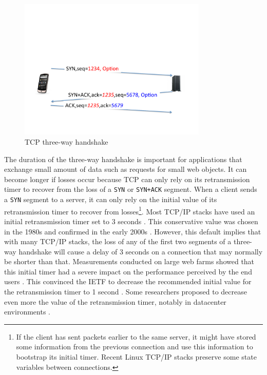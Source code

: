 \begin{figure}
\begin{center}
\includegraphics[width=0.8\textwidth]{figures/mptcp-ebook/Diapositive05.pdf}
\end{center}
\caption{TCP three-way handshake}\label{fig:tcp-establish}
\end{figure}


The duration of the three-way handshake is important for applications that exchange small amount of data such as requests for small web objects. It can become longer if losses occur because TCP can only rely on its retransmission timer to recover from the loss of a \texttt{SYN} or \texttt{SYN+ACK} segment. When a client sends a \texttt{SYN} segment to a server, it can only rely on the initial value of its retransmission timer to recover from losses\footnote{If the client has sent packets earlier to the same server, it might have stored some information from the previous connection \cite{rfc2140,Balakrishnan:1999:ICM:316188.316220} and use this information to bootstrap its initial timer. Recent Linux TCP/IP stacks preserve some state variables between connections.}. Most TCP/IP stacks have used an initial retransmission timer set to 3 seconds \cite{rfc1122}. This conservative value was chosen in the 1980s and confirmed in the early 2000s \cite{rfc2988}. However, this default implies that with many TCP/IP stacks, the loss of any of the first two segments of a three-way handshake will cause a delay of 3 seconds on a connection that may normally be shorter than that. Measurements conducted on large web farms showed that this initial timer had a severe impact on the performance perceived by the end users \cite{Chu_Tuning:2009}. This convinced the IETF to decrease the recommended initial value for the retransmission timer to 1 second \cite{rfc6298}. Some researchers proposed to decrease even more the value of the retransmission timer, notably in datacenter environments \cite{Vasudevan:2009:SEF:1592568.1592604}.

